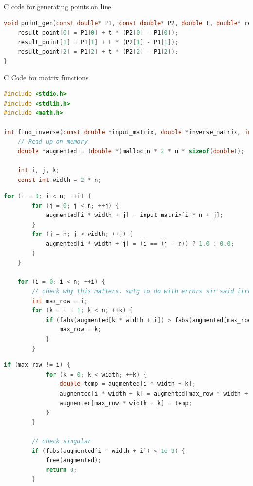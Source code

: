 \documentclass{beamer}
\theoremstyle{remark}
\numberwithin{equation}{section}
\begin{document}
\begin{frame}[fragile]{C code for generating points on line}
\begin{lstlisting}[language=C]
void point_gen(const double* P1, const double* P2, double t, double* result_point) {
    result_point[0] = P1[0] + t * (P2[0] - P1[0]);
    result_point[1] = P1[1] + t * (P2[1] - P1[1]);
    result_point[2] = P1[2] + t * (P2[2] - P1[2]);
}
\end{lstlisting}
\end{frame}
\begin{frame}[fragile]{C Code for matrix functions}
 \begin{lstlisting}[language=C]
#include <stdio.h>
#include <stdlib.h>
#include <math.h>

int find_inverse(const double *input_matrix, double *inverse_matrix, int n) {
    // Read up on memory
    double *augmented = (double *)malloc(n * 2 * n * sizeof(double));

    int i, j, k;
    const int width = 2 * n;
\end{lstlisting}
\end{frame}
\begin{frame}[fragile]
\begin{lstlisting}[language=C]
    for (i = 0; i < n; ++i) {
        for (j = 0; j < n; ++j) {
            augmented[i * width + j] = input_matrix[i * n + j];
        }
        for (j = n; j < width; ++j) {
            augmented[i * width + j] = (i == (j - n)) ? 1.0 : 0.0;
        }
    }

    for (i = 0; i < n; ++i) {
        // check why this matters. smtg to do with errors sir said iirc
        int max_row = i;
        for (k = i + 1; k < n; ++k) {
            if (fabs(augmented[k * width + i]) > fabs(augmented[max_row * width + i])) {
                max_row = k;
            }
        }
\end{lstlisting}
\end{frame}
\begin{frame}[fragile]
\begin{lstlisting}[language=C]
        if (max_row != i) {
            for (k = 0; k < width; ++k) {
                double temp = augmented[i * width + k];
                augmented[i * width + k] = augmented[max_row * width + k];
                augmented[max_row * width + k] = temp;
            }
        }

        // check singular
        if (fabs(augmented[i * width + i]) < 1e-9) {
            free(augmented);
            return 0;
        }
\end{lstlisting}
\end{frame}
\end{document}
